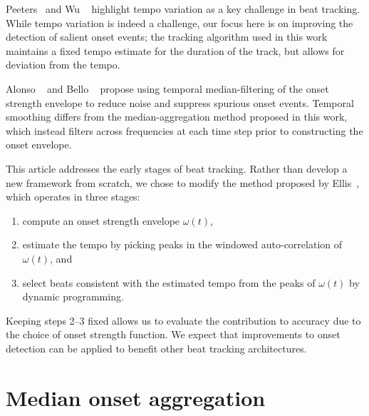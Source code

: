 \documentclass{article}
\begin{document}
Peeters~\cite{peeters2005time} and Wu \etal~\cite{wu2011two} highlight tempo variation as a 
key challenge in beat tracking. While tempo variation is indeed a challenge, our focus here 
is on improving the detection of salient onset events; the tracking algorithm used in
this work maintains a fixed tempo estimate for the duration of the track, but allows for
deviation from the tempo.

Alonso \etal~\cite{alonso2004tempo} and Bello \etal~\cite{bello2005tutorial} propose using 
temporal median-filtering of the onset strength envelope to reduce noise and suppress
spurious onset events.  Temporal smoothing differs from the median-aggregation method 
proposed in this work, which instead filters across frequencies at each time step prior to
constructing the onset envelope.

This article addresses the early stages of beat tracking.  Rather
than develop a new framework from scratch, we chose to modify the method
proposed by Ellis~\cite{ellis2007beat}, which operates in three stages:
\begin{enumerate}\addtolength{\itemsep}{-0.60\baselineskip}
\item compute an onset strength envelope $\omega(t)$,
\item estimate the tempo by picking peaks in the windowed auto-correlation of $\omega(t)$,
and
\item select beats consistent with the estimated tempo from the peaks of $\omega(t)$ by 
dynamic programming.
\end{enumerate}
Keeping steps 2--3 fixed allows us to evaluate the contribution to accuracy due to the
choice of onset strength function.
We expect that improvements to onset detection can be applied to benefit other beat
tracking architectures.

\section{Median onset aggregation}
\label{sec:onsets}
\end{document}
